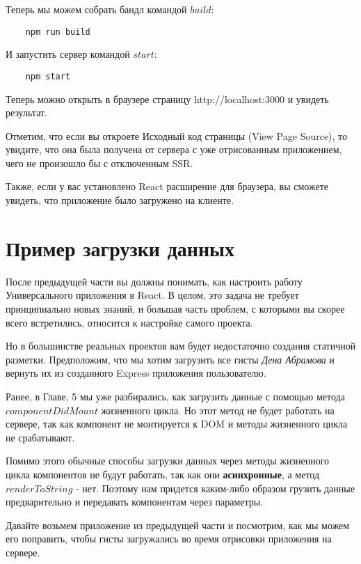 Теперь мы можем собрать бандл командой $build$:

\begin{lstlisting}
	npm run build
\end{lstlisting}

И запустить сервер командой $start$:

\begin{lstlisting}
	npm start
\end{lstlisting}

Теперь можно открыть в браузере страницу http://localhost:3000 и увидеть результат.	

Отметим, что если вы откроете Исходный код страницы (View Page Source), то увидите, что она была получена от сервера с уже отрисованным приложением, чего не произошло бы с отключенным SSR.

Также, если у вас установлено React расширение для браузера, вы сможете увидеть, что приложение было загружено на клиенте.

\section{Пример загрузки данных}

После предыдущей части вы должны понимать, как настроить работу Универсального приложения в React. В целом, это задача не требует принципиально новых знаний, и большая часть проблем, с которыми вы скорее всего встретились, относится к настройке самого проекта.

Но в большинстве реальных проектов вам будет недостаточно создания статичной разметки. Предположим, что мы хотим загрузить все гисты \textit{Дена Абрамова} и вернуть их из созданного Express приложения пользователю.

Ранее, в Главе, 5 мы уже разбирались, как загрузить данные с помощью метода $componentDidMount$ жизненного цикла. Но этот метод не будет работать на сервере, так как компонент не монтируется к DOM и методы жизненного цикла не срабатывают.

Помимо этого обычные способы загрузки данных через методы жизненного цикла компонентов не будут работать, так как они \textbf{асинхронные}, а метод $renderToString$ - нет. Поэтому нам придется каким-либо образом грузить данные предварительно и передавать компонентам через параметры.

Давайте возьмем приложение из предыдущей части и посмотрим, как мы можем его поправить, чтобы гисты загружались во время отрисовки приложения на сервере.

